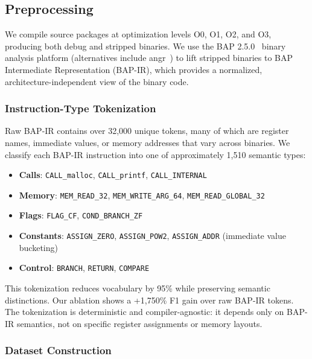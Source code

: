 \documentclass[sigconf,nonacm]{acmart}
\begin{document}
\subsection{Preprocessing}
\label{sec:preprocessing}

We compile source packages at optimization levels O0, O1, O2, and O3, producing both debug and stripped binaries. We use the BAP 2.5.0~\cite{bap} binary analysis platform (alternatives include angr~\cite{angr}) to lift stripped binaries to BAP Intermediate Representation (BAP-IR), which provides a normalized, architecture-independent view of the binary code.

\subsubsection{Instruction-Type Tokenization}
\label{sec:tokenization}

Raw BAP-IR contains over 32,000 unique tokens, many of which are register names, immediate values, or memory addresses that vary across binaries. We classify each BAP-IR instruction into one of approximately 1,510 semantic types:

\begin{itemize}
    \item \textbf{Calls}: \texttt{CALL\_malloc}, \texttt{CALL\_printf}, \texttt{CALL\_INTERNAL}
    \item \textbf{Memory}: \texttt{MEM\_READ\_32}, \texttt{MEM\_WRITE\_ARG\_64}, \texttt{MEM\_READ\_\allowbreak{}GLOBAL\_32}
    \item \textbf{Flags}: \texttt{FLAG\_CF}, \texttt{COND\_BRANCH\_ZF}
    \item \textbf{Constants}: \texttt{ASSIGN\_ZERO}, \texttt{ASSIGN\_POW2}, \texttt{ASSIGN\_ADDR} (immediate value bucketing)
    \item \textbf{Control}: \texttt{BRANCH}, \texttt{RETURN}, \texttt{COMPARE}
\end{itemize}

This tokenization reduces vocabulary by 95\% while preserving semantic distinctions. Our ablation shows a +1,750\% F1 gain over raw BAP-IR tokens. The tokenization is deterministic and compiler-agnostic: it depends only on BAP-IR semantics, not on specific register assignments or memory layouts.

\subsubsection{Dataset Construction}
\label{sec:dataset_construction}
\end{document}
